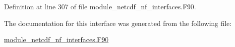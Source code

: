 Definition at line 307 of file module\+\_\+netcdf\+\_\+nf\+\_\+interfaces.\+F90.



The documentation for this interface was generated from the following file\+:\begin{DoxyCompactItemize}
\item 
\hyperlink{module__netcdf__nf__interfaces_8F90}{module\+\_\+netcdf\+\_\+nf\+\_\+interfaces.\+F90}\end{DoxyCompactItemize}
